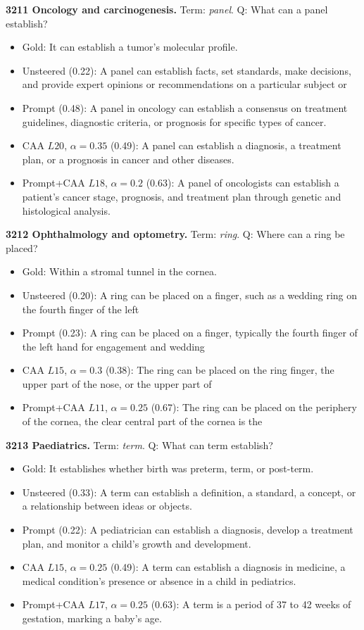 \medskip\noindent\textbf{3211 Oncology and carcinogenesis.} Term: \emph{panel}.
Q: What can a panel establish?
\begin{itemize}\setlength{\itemsep}{0.15em}\setlength{\parsep}{0pt}\setlength{\topsep}{0.2em}
\item Gold: It can establish a tumor's molecular profile.
\item Unsteered (0.22): A panel can establish facts, set standards, make decisions, and provide expert opinions or recommendations on a particular subject or
\item Prompt (0.48): A panel in oncology can establish a consensus on treatment guidelines, diagnostic criteria, or prognosis for specific types of cancer.
\item CAA $L20$, $\alpha=0.35$ (0.49): A panel can establish a diagnosis, a treatment plan, or a prognosis in cancer and other diseases.
\item Prompt+CAA $L18$, $\alpha=0.2$ (0.63): A panel of oncologists can establish a patient's cancer stage, prognosis, and treatment plan through genetic and histological analysis.
\end{itemize}
\medskip\noindent\textbf{3212 Ophthalmology and optometry.} Term: \emph{ring}.
Q: Where can a ring be placed?
\begin{itemize}\setlength{\itemsep}{0.15em}\setlength{\parsep}{0pt}\setlength{\topsep}{0.2em}
\item Gold: Within a stromal tunnel in the cornea.
\item Unsteered (0.20): A ring can be placed on a finger, such as a wedding ring on the fourth finger of the left
\item Prompt (0.23): A ring can be placed on a finger, typically the fourth finger of the left hand for engagement and wedding
\item CAA $L15$, $\alpha=0.3$ (0.38): The ring can be placed on the ring finger, the upper part of the nose, or the upper part of
\item Prompt+CAA $L11$, $\alpha=0.25$ (0.67): The ring can be placed on the periphery of the cornea, the clear central part of the cornea is the
\end{itemize}
\medskip\noindent\textbf{3213 Paediatrics.} Term: \emph{term}.
Q: What can term establish?
\begin{itemize}\setlength{\itemsep}{0.15em}\setlength{\parsep}{0pt}\setlength{\topsep}{0.2em}
\item Gold: It establishes whether birth was preterm, term, or post-term.
\item Unsteered (0.33): A term can establish a definition, a standard, a concept, or a relationship between ideas or objects.
\item Prompt (0.22): A pediatrician can establish a diagnosis, develop a treatment plan, and monitor a child's growth and development.
\item CAA $L15$, $\alpha=0.25$ (0.49): A term can establish a diagnosis in medicine, a medical condition's presence or absence in a child in pediatrics.
\item Prompt+CAA $L17$, $\alpha=0.25$ (0.63): A term is a period of 37 to 42 weeks of gestation, marking a baby's age.
\end{itemize}
